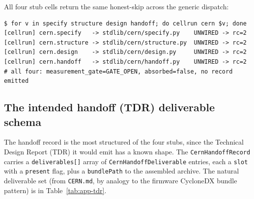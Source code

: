 All four stub cells return the same honest-skip across the generic
dispatch:

\begin{lstlisting}
$ for v in specify structure design handoff; do cellrun cern $v; done
[cellrun] cern.specify   -> stdlib/cern/specify.py    UNWIRED -> rc=2
[cellrun] cern.structure -> stdlib/cern/structure.py  UNWIRED -> rc=2
[cellrun] cern.design    -> stdlib/cern/design.py     UNWIRED -> rc=2
[cellrun] cern.handoff   -> stdlib/cern/handoff.py    UNWIRED -> rc=2
# all four: measurement_gate=GATE_OPEN, absorbed=false, no record emitted
\end{lstlisting}

\noindent{}

\subsection{The intended handoff (TDR) deliverable schema}
\label{app:stubs-tdr}

The handoff record is the most structured of the four stubs, since the
Technical Design Report (TDR) it would emit has a known shape. The
\verb|CernHandoffRecord| carries a \verb|deliverables[]| array of
\verb|CernHandoffDeliverable| entries, each a \verb|slot| with a
\verb|present| flag, plus a \verb|bundlePath| to the assembled archive.
The natural deliverable set (from \texttt{CERN.md}, by analogy to the
firmware CycloneDX bundle pattern) is in Table~\ref{tab:app-tdr}.

